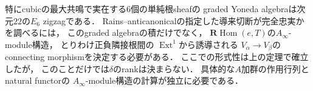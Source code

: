 \begin{remark}[導来比較を監査する新しい有限モデル]
特にcubicの最大共鳴で実在する$6$個の単純根sheafの
graded Yoneda algebraは次元$22$の$E_6$ zigzagである．
Rains--anticanonicalの指定した導来切断が完全忠実かを調べるには，
このgraded algebraの積だけでなく，
$\mathbf R\operatorname{Hom}(e,T)$の$A_\infty$-module構造，
とりわけ正負隣接根間の
$\operatorname{Ext}^1$から誘導される
$V_\alpha\to V_\beta$のconnecting morphismを決定する必要がある．
ここでの形式性は上の定理で確立したが，
このことだけでは$\delta$のrankは決まらない．
具体的な$A$加群の作用行列とnatural functorの
$A_\infty$-module構造の計算が独立に必要である．
\end{remark}
